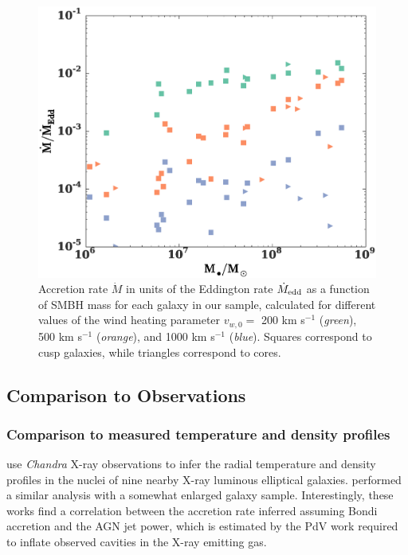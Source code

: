 \documentclass[usenatbib,fleqn]{mn2e}
\newcommand{\vwO}{v_{w,0}}
\begin{document}
\begin{figure}
  \includegraphics[width=\columnwidth]{mdot_mass.eps}
  \caption{\label{fig:mdot_mass}  Accretion rate $\dot{M}$ in units of the Eddington rate $\dot{M}_{\rm edd}$ as a function of SMBH mass for each galaxy in our sample, calculated for different values of the wind heating parameter $\vwO =$ 200 km s$^{-1}$ ({\it green}), 500 km s$^{-1}$ ({\it orange}), and 1000 km s$^{-1}$ ({\it blue}).  Squares correspond to cusp galaxies, while triangles correspond to cores.}
\end{figure}


\subsection{Comparison to Observations}
\subsubsection{Comparison to measured temperature and density profiles}
\citet{AllenDunn+:2006a} use {\it Chandra} X-ray observations to infer the radial temperature and density profiles in the nuclei of nine nearby X-ray luminous elliptical galaxies.  \citet{RussellMcNamara+:2013a} performed a similar analysis with a somewhat enlarged galaxy sample.  Interestingly, these works find a correlation between the accretion rate inferred assuming Bondi accretion and the AGN jet power, which is estimated by the PdV work required to inflate observed cavities in the X-ray emitting gas.  
\end{document}
